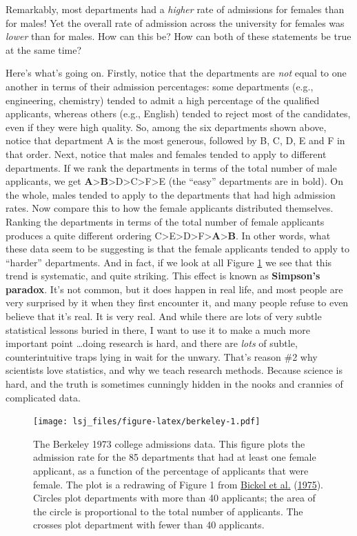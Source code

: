 \documentclass[
]{book}
\begin{document}
Remarkably, most departments had a \emph{higher} rate of admissions for females than for males! Yet the overall rate of admission across the university for females was \emph{lower} than for males. How can this be? How can both of these statements be true at the same time?

Here's what's going on. Firstly, notice that the departments are \emph{not} equal to one another in terms of their admission percentages: some departments (e.g., engineering, chemistry) tended to admit a high percentage of the qualified applicants, whereas others (e.g., English) tended to reject most of the candidates, even if they were high quality. So, among the six departments shown above, notice that department A is the most generous, followed by B, C, D, E and F in that order. Next, notice that males and females tended to apply to different departments. If we rank the departments in terms of the total number of male applicants, we get \textbf{A}\textgreater{}\textbf{B}\textgreater D\textgreater C\textgreater F\textgreater E (the ``easy'' departments are in bold). On the whole, males tended to apply to the departments that had high admission rates. Now compare this to how the female applicants distributed themselves. Ranking the departments in terms of the total number of female applicants produces a quite different ordering C\textgreater E\textgreater D\textgreater F\textgreater{}\textbf{A}\textgreater{}\textbf{B}. In other words, what these data seem to be suggesting is that the female applicants tended to apply to ``harder'' departments. And in fact, if we look at all Figure \ref{fig:berkeley} we see that this trend is systematic, and quite striking. This effect is known as {\textbf{Simpson's paradox}}. It's not common, but it does happen in real life, and most people are very surprised by it when they first encounter it, and many people refuse to even believe that it's real. It is very real. And while there are lots of very subtle statistical lessons buried in there, I want to use it to make a much more important point \ldots doing research is hard, and there are \emph{lots} of subtle, counterintuitive traps lying in wait for the unwary. That's reason \#2 why scientists love statistics, and why we teach research methods. Because science is hard, and the truth is sometimes cunningly hidden in the nooks and crannies of complicated data.

\begin{figure}
\centering
\texttt{[image: lsj\_files/figure-latex/berkeley-1.pdf]}
\caption{\label{fig:berkeley}The Berkeley 1973 college admissions data. This figure plots the admission rate for the 85 departments that had at least one female applicant, as a function of the percentage of applicants that were female. The plot is a redrawing of Figure 1 from \protect\hyperlink{ref-Bickel1975}{Bickel et al.} (\protect\hyperlink{ref-Bickel1975}{1975}). Circles plot departments with more than 40 applicants; the area of the circle is proportional to the total number of applicants. The crosses plot department with fewer than 40 applicants.}
\end{figure}
\end{document}
